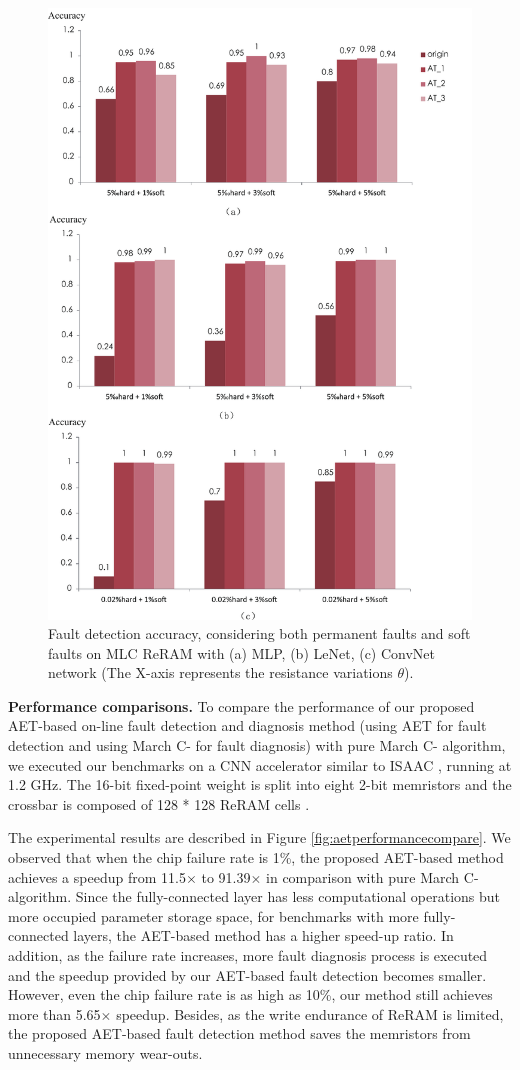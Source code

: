 \begin{figure}[t]
    \centering
    \includegraphics[width=0.7\linewidth]{images/OL-fig13}
    \caption{Fault detection accuracy, considering both permanent faults and soft faults on MLC ReRAM with (a) MLP, (b) LeNet, (c) ConvNet network (The X-axis represents the resistance variations $\theta$).}
    \label{fig:mlc-hard-soft}
\end{figure}


{\bf Performance comparisons.} To compare the performance of our proposed AET-based on-line fault detection and diagnosis method (using AET for fault detection and using March C- for fault diagnosis) with pure March C- algorithm, we executed our benchmarks on a CNN accelerator similar to ISAAC \cite{7551379}, running at 1.2 GHz. The 16-bit fixed-point weight is split into eight 2-bit memristors and the crossbar is composed of 128 * 128  ReRAM cells \cite{Xiangyu2011}. 

The experimental results are described in Figure \ref{fig:aetperformancecompare}. We observed that when the chip failure rate is 1\%, the proposed AET-based method achieves a speedup from 11.5$\times$ to 91.39$\times$ in comparison with pure March C- algorithm. Since the fully-connected layer has less computational operations but more occupied parameter storage space, for benchmarks with more fully-connected layers, the AET-based method has a higher speed-up ratio. In addition, as the failure rate increases, more fault diagnosis process is executed and the speedup provided by our AET-based fault detection becomes smaller. However, even the chip failure rate is as high as 10\%, our method still achieves more than 5.65$\times$ speedup. Besides, as the write endurance of ReRAM is limited, the proposed AET-based fault detection method saves the memristors from unnecessary memory wear-outs.


